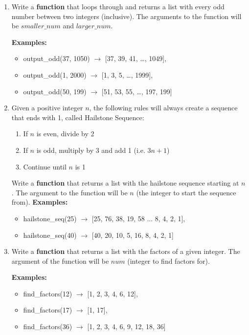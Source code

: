 \documentclass{article}
\begin{document}
\begin{enumerate}
	\item 
		Write a \textbf{function} that loops through and returns a list with every odd number between two
		integers (inclusive). The arguments to the function will be $smaller\_num$ and 
		$larger\_num$.

		\textbf{Examples:}		
		\begin{itemize}
			\item  output\_odd(37, 1050) $\rightarrow$ [37, 39, 41, \dots, 1049], 
			\item  output\_odd(1, 2000) $\rightarrow$ [1, 3, 5, \dots, 1999], 
			\item  output\_odd(50, 199) $\rightarrow$ [51, 53, 55, \dots, 197, 199]
		\end{itemize}


	\item 
		Given a positive integer $n$, the following rules will always create a sequence that 
		ends with 1, called Hailstone Sequence:
		\begin{enumerate}
			\item If $n$ is even, divide by 2
			\item If $n$ is odd, multiply by 3 and add 1 (i.e. $3n+1$)
			\item Continue until $n$ is 1
		\end{enumerate}
		Write a \textbf{function} that returns a list with the hailstone sequence starting at $n$. 
		The argument to the function will be $n$ (the integer to start the sequence from).
		\textbf{Examples:}		
		\begin{itemize}
			\item  hailstone\_seq(25) $\rightarrow$ [25, 76, 38, 19, 58 ... 8, 4, 2, 1], 
			\item  hailstone\_seq(40) $\rightarrow$ [40, 20, 10, 5, 16, 8, 4, 2, 1]
		\end{itemize}



	\item 
		Write a \textbf{function} that returns a list with the factors of a given integer. The argument of the function
		will be $num$ (integer to find factors for).

		\textbf{Examples:}		
		\begin{itemize}
			\item  find\_factors(12) $\rightarrow$ [1, 2, 3, 4, 6, 12], 
			\item  find\_factors(17) $\rightarrow$ [1, 17],
			\item  find\_factors(36) $\rightarrow$ [1, 2, 3, 4, 6, 9, 12, 18, 36]
		\end{itemize}




\end{enumerate}
\end{document}

